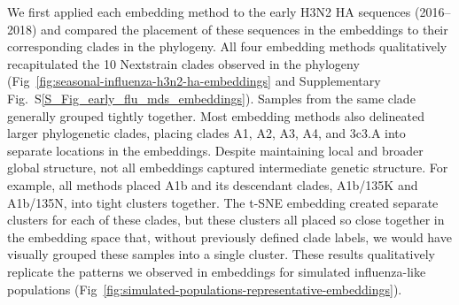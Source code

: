 \documentclass[webpdf,contemporary,large,single]{oup-authoring-template}%
\theoremstyle{thmstyleone}%
\theoremstyle{thmstyletwo}%
\theoremstyle{thmstylethree}%
\begin{document}
We first applied each embedding method to the early H3N2 HA sequences (2016--2018) and compared the placement of these sequences in the embeddings to their corresponding clades in the phylogeny.
All four embedding methods qualitatively recapitulated the 10 Nextstrain clades observed in the phylogeny (Fig~\ref{fig:seasonal-influenza-h3n2-ha-embeddings} and Supplementary Fig.~S\ref{S_Fig_early_flu_mds_embeddings}).
Samples from the same clade generally grouped tightly together.
Most embedding methods also delineated larger phylogenetic clades, placing clades A1, A2, A3, A4, and 3c3.A into separate locations in the embeddings.
Despite maintaining local and broader global structure, not all embeddings captured intermediate genetic structure.
For example, all methods placed A1b and its descendant clades, A1b/135K and A1b/135N, into tight clusters together.
The t-SNE embedding created separate clusters for each of these clades, but these clusters all placed so close together in the embedding space that, without previously defined clade labels, we would have visually grouped these samples into a single cluster.
These results qualitatively replicate the patterns we observed in embeddings for simulated influenza-like populations (Fig~\ref{fig:simulated-populations-representative-embeddings}).

\end{document}
